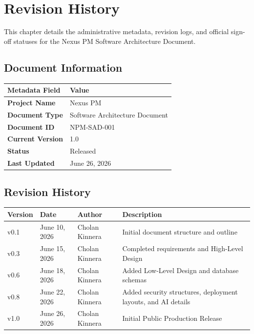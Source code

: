\chapter{Revision History}
\label{chap:revision-history}

This chapter details the administrative metadata, revision logs, and official sign-off statuses for the Nexus PM Software Architecture Document.

\section*{Document Information}

\begingroup
\renewcommand{\arraystretch}{1.5}
\begin{tabularx}{\textwidth}{>{\bfseries\color{primary}}l X}
    \toprule[1.5pt]
    \rowcolor{primary!5}
    \textbf{\color{primary}Metadata Field} & \textbf{\color{primary}Value} \\
    \midrule
    Project Name      & Nexus PM \\
    Document Type     & Software Architecture Document \\
    Document ID       & NPM-SAD-001 \\
    Current Version   & 1.0 \\
    Status            & Released \\
    Last Updated      & June 26, 2026 \\
    \bottomrule[1.5pt]
\end{tabularx}
\endgroup

\vspace{2em}

\section*{Revision History}

\begingroup
\renewcommand{\arraystretch}{1.5}
\begin{tabularx}{\textwidth}{l l l X}
    \toprule[1.5pt]
    \rowcolor{primary!5}
    \textbf{\color{primary}Version} & \textbf{\color{primary}Date} & \textbf{\color{primary}Author} & \textbf{\color{primary}Description} \\
    \midrule
    v0.1 & June 10, 2026 & Cholan Kinnera & Initial document structure and outline \\
    v0.3 & June 15, 2026 & Cholan Kinnera & Completed requirements and High-Level Design \\
    v0.6 & June 18, 2026 & Cholan Kinnera & Added Low-Level Design and database schemas \\
    v0.8 & June 22, 2026 & Cholan Kinnera & Added security structures, deployment layouts, and AI details \\
    v1.0 & June 26, 2026 & Cholan Kinnera & Initial Public Production Release \\
    \bottomrule[1.5pt]
\end{tabularx}
\endgroup

